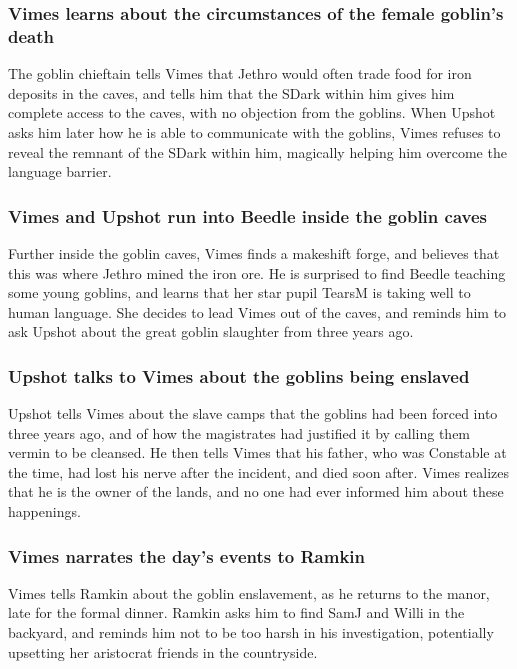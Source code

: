 \subsubsection{\Gls{Vimes} learns about the circumstances of the female goblin's death}
The goblin chieftain tells \Gls{Vimes} that \Gls{Jethro} would often trade food for iron deposits
in the caves, and tells him that the \Gls{SDark} within him gives him complete access to the caves,
with no objection from the goblins. When \Gls{Upshot} asks him later how he is able to communicate
with the goblins, \Gls{Vimes} refuses to reveal the remnant of the \Gls{SDark} within him, magically
helping him overcome the language barrier.

\subsubsection{\Gls{Vimes} and \Gls{Upshot} run into \Gls{Beedle} inside the goblin caves}
Further inside the goblin caves, \Gls{Vimes} finds a makeshift forge, and believes that this was
where \Gls{Jethro} mined the iron ore. He is surprised to find \Gls{Beedle} teaching some young
goblins, and learns that her star pupil \Gls{TearsM} is taking well to human language. She decides
to lead \Gls{Vimes} out of the caves, and reminds him to ask \Gls{Upshot} about the great goblin
slaughter from three years ago.

\subsubsection{\Gls{Upshot} talks to \Gls{Vimes} about the goblins being enslaved}
\Gls{Upshot} tells \Gls{Vimes} about the slave camps that the goblins had been forced into three
years ago, and of how the magistrates had justified it by calling them vermin to be cleansed.
He then tells \Gls{Vimes} that his father, who was Constable at the time, had lost his nerve after
the incident, and died soon after. \Gls{Vimes} realizes that he is the owner of the lands, and no
one had ever informed him about these happenings.

\subsubsection{\Gls{Vimes} narrates the day's events to \Gls{Ramkin}}
\Gls{Vimes} tells \Gls{Ramkin} about the goblin enslavement, as he returns to the manor, late for
the formal dinner. \Gls{Ramkin} asks him to find \Gls{SamJ} and \Gls{Willi} in the backyard, and
reminds him not to be too harsh in his investigation, potentially upsetting her aristocrat friends
in the countryside.

